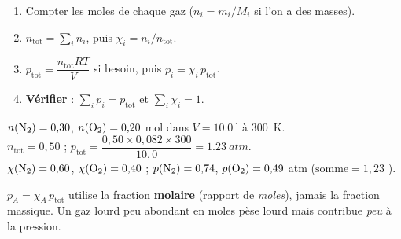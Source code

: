 \documentclass[11pt,a4paper]{article}
\begin{document}
\begin{methode}
\begin{enumerate}[leftmargin=1.6em,topsep=2pt,itemsep=1pt]
  \item Compter les moles de chaque gaz ($n_i=m_i/M_i$ si l'on a des masses).
  \item $n_{\text{tot}}=\sum_i n_i$, puis $\chi_i=n_i/n_{\text{tot}}$.
  \item $p_{\text{tot}}=\dfrac{n_{\text{tot}}RT}{V}$ si besoin, puis $p_i=\chi_i\,p_{\text{tot}}$.
  \item \textbf{Vérifier} : $\sum_i p_i=p_{\text{tot}}$ et $\sum_i\chi_i=1$.
\end{enumerate}
\end{methode}

\begin{exemplebox}[un mélange \ce{N2}/\ce{O2}]
$n(\ce{N2})=0{,}30$, $n(\ce{O2})=0{,}20$ mol dans $V=\qty{10.0}{\litre}$ à \qty{300}{\kelvin}. \\
$n_{\text{tot}}=0{,}50$ ; $p_{\text{tot}}=\dfrac{0{,}50\times0{,}082\times300}{10{,}0}=\qty{1.23}{atm}$. \\
$\chi(\ce{N2})=0{,}60$, $\chi(\ce{O2})=0{,}40$ ; $p(\ce{N2})=0{,}74$, $p(\ce{O2})=0{,}49$ \si{atm}
($\text{somme}=1{,}23$ \checkmark).
\end{exemplebox}

\begin{piege}
$p_A=\chi_A\,p_{\text{tot}}$ utilise la fraction \textbf{molaire} (rapport de \emph{moles}), jamais la
fraction massique. Un gaz lourd peu abondant en moles pèse lourd mais contribue \emph{peu} à la
pression.
\end{piege}
\end{document}
